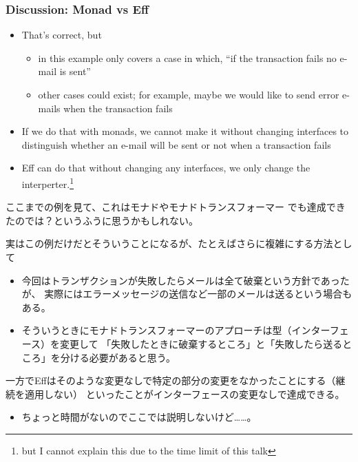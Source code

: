 \begin{frame}
  \frametitle{Discussion: Monad vs Eff}

  \pause

  \begin{itemize}
    \item<+-> That's correct, but
    \begin{itemize}
      \item in this example only covers a case in which,
      ``if the transaction fails no e-mail is sent''

      \item other cases could exist;
      for example, maybe we would like to send error e-mails
      when the transaction fails
    \end{itemize}

    \item<+-> If we do that with monads,
    we cannot make it without changing interfaces to distinguish
    whether an e-mail will be sent or not when a transaction fails

    \item<+-> Eff can do that without changing any interfaces,
    we only change the interperter.\footnote[frame]{%
      but I cannot explain this due to the time limit of this talk
    }%
  \end{itemize}

  \begin{notes}
    \item ここまでの例を見て、これはモナドやモナドトランスフォーマー
    でも達成できたのでは？というふうに思うかもしれない。

    \item 実はこの例だけだとそういうことになるが、たとえばさらに複雑にする方法として
    \begin{itemize}
      \item 今回はトランザクションが失敗したらメールは全て破棄という方針であったが、
      実際にはエラーメッセージの送信など一部のメールは送るという場合もある。

      \item そういうときにモナドトランスフォーマーのアプローチは型（インターフェース）を変更して
      「失敗したときに破棄するところ」と「失敗したら送るところ」を分ける必要があると思う。
    \end{itemize}

    \item 一方でEffはそのような変更なしで特定の部分の変更をなかったことにする（継続を適用しない）
    といったことがインターフェースの変更なしで達成できる。
    \begin{itemize}
      \item ちょっと時間がないのでここでは説明しないけど……。
    \end{itemize}
  \end{notes}
\end{frame}


